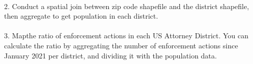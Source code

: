 \documentclass[
  letterpaper,
  DIV=11,
  numbers=noendperiod]{scrartcl}
\makeatletter
\let\oldparagraph\paragraph
\renewcommand{\paragraph}{
    \@ifstar
      \xxxParagraphStar
      \xxxParagraphNoStar
  }
\newcommand{\xxxParagraphStar}[1]{\oldparagraph*{#1}\mbox{}}
\newcommand{\xxxParagraphNoStar}[1]{\oldparagraph{#1}\mbox{}}
\makeatother
\begin{document}
\paragraph{2. Conduct a spatial join between zip code shapefile and the
district shapefile, then aggregate to get population in each
district.}\label{conduct-a-spatial-join-between-zip-code-shapefile-and-the-district-shapefile-then-aggregate-to-get-population-in-each-district.}

\paragraph{3. Mapthe ratio of enforcement actions in each US Attorney
District. You can calculate the ratio by aggregating the number of
enforcement actions since January 2021 per district, and dividing it
with the population
data.}\label{mapthe-ratio-of-enforcement-actions-in-each-us-attorney-district.-you-can-calculate-the-ratio-by-aggregating-the-number-of-enforcement-actions-since-january-2021-per-district-and-dividing-it-with-the-population-data.}
\end{document}
